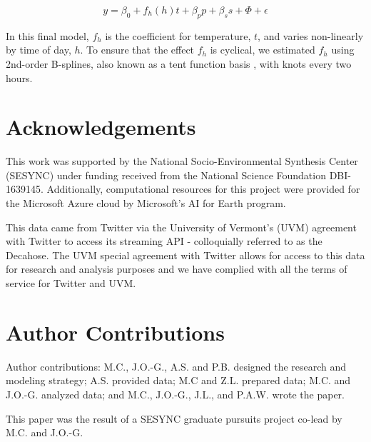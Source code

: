 \documentclass[fleqn,10pt]{wlscirep}
\begin{document}
\begin{equation}
    y = \beta_0 + f_h(h)t + \beta_p p + \beta_s s + \Phi + \epsilon
    \label{mod:tod}
\end{equation}

In this final model, $f_{h}$ is the coefficient for temperature, $t$, and varies non-linearly by time of day, $h$.  To ensure that the effect $f_{h}$ is cyclical, we estimated $f_{h}$ using 2nd-order B-splines, also known as a tent function basis \cite[Chapter~4.2]{wood2017generalized}, with knots every two hours.

\section*{Acknowledgements}
This work was supported by the National Socio-Environmental Synthesis Center (SESYNC) under funding received from the National Science Foundation DBI-1639145.  Additionally, computational resources for this project were provided for the Microsoft Azure cloud by Microsoft's AI for Earth program.

This data came from Twitter via the University of Vermont’s (UVM) agreement with Twitter to access its streaming API - colloquially referred to as the Decahose.  The UVM special agreement with Twitter allows for access to this data for research and analysis purposes and we have complied with all the terms of service for Twitter and UVM. 



\section*{Author Contributions}
Author contributions: M.C., J.O.-G., A.S. and P.B. designed the research and modeling strategy; A.S. provided data; M.C and Z.L. prepared data; M.C. and J.O.-G. analyzed data; and M.C., J.O.-G., J.L., and P.A.W. wrote the paper.

\noindent This paper was the result of a SESYNC graduate pursuits project co-lead by M.C. and J.O.-G.
\end{document}
